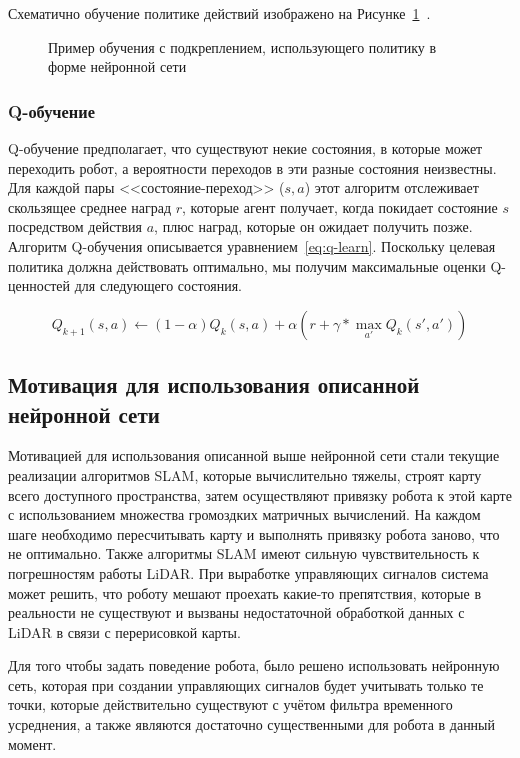 Схематично обучение политике действий изображено на Рисунке~\cref{fig:act-policy}~\cite{reinforcement}. 

\begin{figure}[ht]
    \caption{Пример обучения с подкреплением, использующего политику в форме нейронной сети}\label{fig:act-policy}
\end{figure}

\subsubsection{Q-обучение}
Q-обучение предполагает, что существуют некие состояния, в которые может переходить робот, а вероятности переходов в эти разные состояния неизвестны. Для каждой пары <<состояние-переход>> ($s, a$) этот алгоритм отслеживает скользящее среднее наград $r$, которые агент получает, когда покидает состояние $s$ посредством действия $a$, плюс наград, которые он ожидает получить позже. Алгоритм Q-обучения описывается уравнением~\cref{eq:q-learn}. Поскольку целевая политика должна действовать оптимально, мы получим максимальные оценки Q-ценностей для следующего состояния.

\begin{equation}
    \label{eq:q-learn}
    Q_{k+1}(s,a)\leftarrow (1-\alpha )Q_{k}(s,a)+\alpha (r+\gamma * \max_{a'}Q_{k}(s',a'))
\end{equation}

\subsection{Мотивация для использования описанной нейронной сети}
Мотивацией для использования описанной выше нейронной сети стали текущие реализации алгоритмов SLAM, которые вычислительно тяжелы, строят карту всего доступного пространства, затем осуществляют привязку робота к этой карте с использованием множества громоздких матричных вычислений. На каждом шаге необходимо пересчитывать карту и выполнять привязку робота заново, что не оптимально. Также алгоритмы SLAM имеют сильную чувствительность к погрешностям работы LiDAR. При выработке управляющих сигналов система может решить, что роботу мешают проехать какие-то препятствия, которые в реальности не существуют и вызваны недостаточной обработкой данных с LiDAR в связи с перерисовкой карты. 

Для того чтобы задать поведение робота, было решено использовать нейронную сеть, которая при создании управляющих сигналов будет учитывать только те точки, которые действительно существуют с учётом фильтра временного усреднения, а также являются достаточно существенными для робота в данный момент. 

